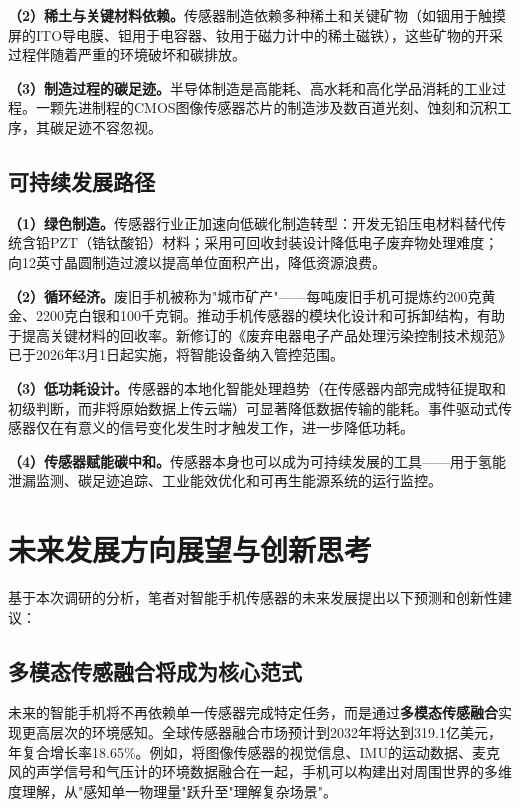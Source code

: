 \documentclass[12pt, a4paper]{ctexart}
\begin{document}
\textbf{（2）稀土与关键材料依赖。}传感器制造依赖多种稀土和关键矿物（如铟用于触摸屏的ITO导电膜、钽用于电容器、钕用于磁力计中的稀土磁铁），这些矿物的开采过程伴随着严重的环境破坏和碳排放。

\textbf{（3）制造过程的碳足迹。}半导体制造是高能耗、高水耗和高化学品消耗的工业过程。一颗先进制程的CMOS图像传感器芯片的制造涉及数百道光刻、蚀刻和沉积工序，其碳足迹不容忽视。

\subsection{可持续发展路径}

\textbf{（1）绿色制造。}传感器行业正加速向低碳化制造转型\cite{innosensor2025}：开发无铅压电材料替代传统含铅PZT（锆钛酸铅）材料；采用可回收封装设计降低电子废弃物处理难度；向12英寸晶圆制造过渡以提高单位面积产出，降低资源浪费。

\textbf{（2）循环经济。}废旧手机被称为"城市矿产"——每吨废旧手机可提炼约200克黄金、2200克白银和100千克铜\cite{stcn2025}。推动手机传感器的模块化设计和可拆卸结构，有助于提高关键材料的回收率。新修订的《废弃电器电子产品处理污染控制技术规范》已于2026年3月1日起实施，将智能设备纳入管控范围\cite{jingji2026}。

\textbf{（3）低功耗设计。}传感器的本地化智能处理趋势（在传感器内部完成特征提取和初级判断，而非将原始数据上传云端）可显著降低数据传输的能耗。事件驱动式传感器仅在有意义的信号变化发生时才触发工作，进一步降低功耗。

\textbf{（4）传感器赋能碳中和。}传感器本身也可以成为可持续发展的工具——用于氢能泄漏监测、碳足迹追踪、工业能效优化和可再生能源系统的运行监控\cite{innosensor2025}。


\section{未来发展方向展望与创新思考}

基于本次调研的分析，笔者对智能手机传感器的未来发展提出以下预测和创新性建议：

\subsection{多模态传感融合将成为核心范式}

未来的智能手机将不再依赖单一传感器完成特定任务，而是通过\textbf{多模态传感融合}实现更高层次的环境感知\cite{hall1997}。全球传感器融合市场预计到2032年将达到319.1亿美元，年复合增长率18.65\%\cite{innosensor2025}。例如，将图像传感器的视觉信息、IMU的运动数据、麦克风的声学信号和气压计的环境数据融合在一起，手机可以构建出对周围世界的多维度理解，从"感知单一物理量"跃升至"理解复杂场景"。
\end{document}
